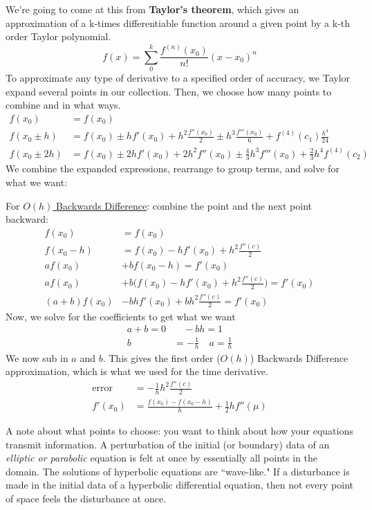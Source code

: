 \documentclass[12pt]{article}
\begin{document}
We're going to come at this from \textbf{Taylor's theorem}, which gives an approximation of a k-times differentiable function around a given point by a k-th order Taylor polynomial.
\[
f(x) = \sum_{0}^{k} \frac{f^{(n)}(x_0)}{n!}(x - x_0)^n
\]
To approximate any type of derivative to a specified order of accuracy, we Taylor expand several points in our collection. Then, we choose how many points to combine and in what ways. 
\begin{align*}
f(x_0) &= f(x_0)\\
%
f(x_0 \pm h) &= f(x_0) \pm hf'(x_0) + h^2\frac{f''(x_0)}{2} \pm h^3\frac{f'''(x_0)}{6} + f^{(4)}(c_1)\frac{h^4}{24} \\
%
f(x_0 \pm 2h) &= f(x_0) \pm 2h f'(x_0) + 2 h^2 f''(x_0) \pm \frac{4}{3} h^3 f'''(x_0) + \frac{2}{3}h^4 f^{(4)}(c_2)
\end{align*}
We combine the expanded expressions, rearrange to group terms, and solve for what we want:

For \underline{$O(h)$ Backwards Difference}: combine the point and the next point backward:
\begin{align*}
f(x_0) &= f(x_0)\\
f(x_0 - h) &= f(x_0) - hf'(x_0) + h^2\frac{f''(c)}{2}\\
a f(x_0) &+ b f(x_0 - h) = f'(x_0) \\
a f(x_0) &+ b \bigl(f(x_0) - hf'(x_0) + h^2\frac{f''(c)}{2} \bigr) = f'(x_0) \\
(a+b)f(x_0) &-bh f'(x_0) + b h^2\frac{f''(c)}{2} = f'(x_0)
\end{align*}
%
Now, we solve for the coefficients to get what we want
\begin{align*}
a+b = 0 &\quad -bh = 1 \\
b &= -\frac{1}{h} \quad a = \frac{1}{h}
\end{align*}
%
We now sub in $a$ and $b$. This gives the first order ($O(h)$) Backwards Difference approximation, which is what we used for the time derivative.
\begin{align*}
\text{error }&= -\frac{1}{h}h^2\frac{f''(c)}{2}\\
f'(x_0) &= \frac{f(x_0) - f(x_0 - h)}{h} + \frac{1}{2}hf''(\mu)
\end{align*}

A note about what points to choose: you want to think about how your equations transmit information. 
A perturbation of the initial (or boundary) data of an \textit{elliptic or parabolic} equation is felt at once by essentially all points in the domain.
The solutions of hyperbolic equations are ``wave-like." If a disturbance is made in the initial data of a hyperbolic differential equation, then not every point of space feels the disturbance at once.
\end{document}
